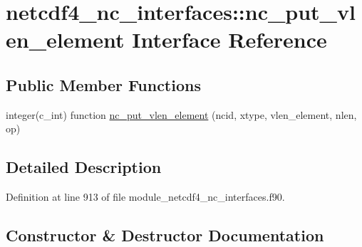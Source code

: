 \hypertarget{interfacenetcdf4__nc__interfaces_1_1nc__put__vlen__element}{}\section{netcdf4\+\_\+nc\+\_\+interfaces\+:\+:nc\+\_\+put\+\_\+vlen\+\_\+element Interface Reference}
\label{interfacenetcdf4__nc__interfaces_1_1nc__put__vlen__element}
\subsection*{Public Member Functions}
\begin{DoxyCompactItemize}
\item 
integer(c\+\_\+int) function \hyperlink{interfacenetcdf4__nc__interfaces_1_1nc__put__vlen__element_a86ab40861b296d069b5e450fafd13fe6}{nc\+\_\+put\+\_\+vlen\+\_\+element} (ncid, xtype, vlen\+\_\+element, nlen, op)
\end{DoxyCompactItemize}


\subsection{Detailed Description}


Definition at line 913 of file module\+\_\+netcdf4\+\_\+nc\+\_\+interfaces.\+f90.



\subsection{Constructor \& Destructor Documentation}
\mbox{\label{interfacenetcdf4__nc__interfaces_1_1nc__put__vlen__element_a86ab40861b296d069b5e450fafd13fe6}} 

